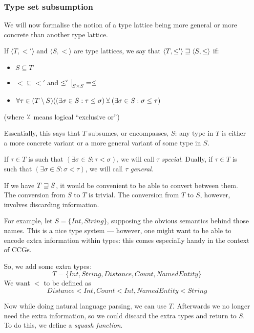 \documentclass[main.tex]{subfiles}
\begin{document}
\subsubsection{Type set subsumption}
We will now formalise the notion of a type lattice being more general
or more concrete than another type lattice.

\begin{defn}
    If $\langle T, \less' \rangle$ and $\langle S, \less \rangle$
    are type lattices, we say that $\langle T, \leq' \rangle \sqsupseteq \langle S, \leq \rangle$ if:
    \begin{itemize}
        \item $S \subseteq T$
        \item $\less \subseteq \less'$ and $\restr{\less'}{S \times S} = \less$
        \item $\forall \tau \in (T \setminus S) ((\exists \sigma \in S : \tau \leq \sigma )
            \veebar (\exists \sigma \in S : \sigma \leq \tau)$
    \end{itemize}
    (where $\veebar$ means logical ``exclusive or'')
\end{defn}

Essentially, this says that $T$ subsumes, or encompasses, $S$: any type in
$T$ is either a more concrete variant or a more general variant of some type in $S$.

If $\tau\in T$ is such that $(\exists \sigma \in S : \tau \less \sigma)$, we will
call $\tau$ \emph{special}. Dually, if $\tau\in T$ is such that
$(\exists \sigma \in S : \sigma \less \tau)$, we will call $\tau$
\emph{general}.

If we have $T \sqsupseteq S$, it would be convenient to be able to convert between them.
The conversion from $S$ to $T$ is trivial. The conversion from $T$ to $S$,
however, involves discarding information.

\begin{example}
    For example, let $S = \{ Int, String \}$, supposing the obvious semantics
    behind those names. This is a nice type system --- however, one might want to
    be able to encode extra information within types: this comes especially
    handy in the context of CCGs.

    So, we add some extra types: \[ T = \{ Int, String, Distance, Count, NamedEntity \} \]
    We want $\less$ to be defined as \[ Distance \less Int, Count \less Int,
    NamedEntity \less String \]

    Now while doing natural language parsing, we can use $T$. Afterwards
    we no longer need the extra information, so we could discard the extra
    types and return to $S$. To do this, we define a \emph{squash function}.
\end{example}
\end{document}
